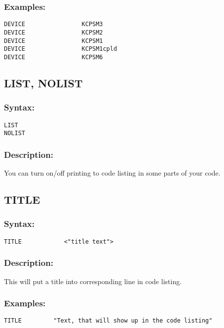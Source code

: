         \subsubsection{Examples:}
            {
                \usecodefont
                \verb'DEVICE                KCPSM3'\\
                \verb'DEVICE                KCPSM2'\\
                \verb'DEVICE                KCPSM1'\\
                \verb'DEVICE                KCPSM1cpld'\\
                \verb'DEVICE                KCPSM6'\\
            }

    \subsection{LIST, NOLIST}
        \subsubsection{Syntax:}
            {
                \usecodefont
                \verb'LIST'\\
                \verb'NOLIST'
            }

        \subsubsection{Description:}
            You can turn on/off printing to code listing in some parts of your code.

    \subsection{TITLE}
        \subsubsection{Syntax:}
            \verb'TITLE            <"title text">'

        \subsubsection{Description:}
        This will put a title into corresponding line in code listing.

        \subsubsection{Examples:}
            {
                \usecodefont
                \verb'TITLE         "Text, that will show up in the code listing"'
            }

